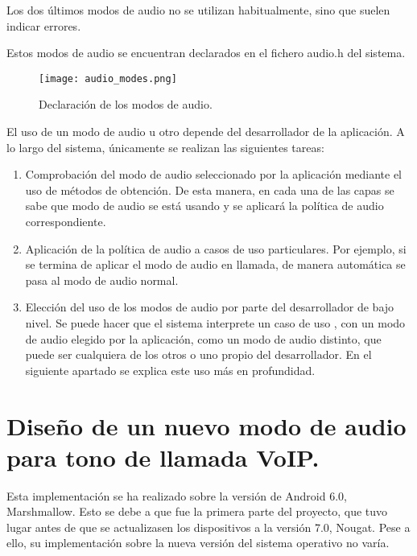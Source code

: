 Los dos últimos modos de audio no se utilizan habitualmente, sino que suelen indicar errores. 

Estos modos de audio se encuentran declarados en el fichero audio.h del sistema. 

%	

\begin{figure}[H]
	\centering
	\texttt{[image: audio\_modes.png]}
	\caption{Declaración de los modos de audio.}
	\label{fig:audio_modes}
\end{figure}

El uso de un modo de audio u otro depende del desarrollador de la aplicación. A lo largo del sistema, únicamente se realizan las siguientes tareas:

\begin{enumerate}
	\item Comprobación del modo de audio seleccionado por la aplicación mediante el uso de métodos de obtención. De esta manera, en cada una de las capas se sabe que modo de audio se está usando y se aplicará la política de audio correspondiente.
	\item Aplicación de la política de audio a casos de uso particulares. Por ejemplo, si se termina de aplicar el modo de audio en llamada, de manera automática se pasa al modo de audio normal.
	\item Elección del uso de los modos de audio por parte del desarrollador de bajo nivel. Se puede hacer que el sistema interprete un caso de uso , con un modo de audio elegido por la aplicación, como un modo de audio distinto, que puede ser cualquiera de los otros o uno propio del desarrollador. En el siguiente apartado se explica este uso más en profundidad.
\end{enumerate}


\section{Diseño de un nuevo modo de audio para tono de llamada VoIP.}
Esta implementación se ha realizado sobre la versión de Android 6.0, Marshmallow. Esto se debe a que fue la primera parte del proyecto, que tuvo lugar antes de que se actualizasen los dispositivos a la versión 7.0, Nougat. Pese a ello, su implementación sobre la nueva versión del sistema operativo no varía.

